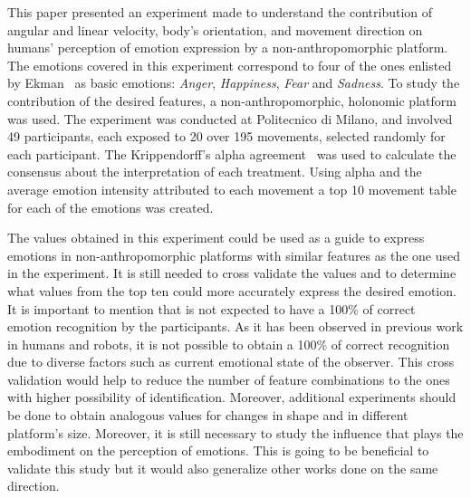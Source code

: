 This paper presented an experiment made to understand the contribution of angular and linear velocity, body's orientation, and movement direction on humans' perception of emotion expression by a non-anthropomorphic platform. The emotions covered in this experiment correspond to four of the ones enlisted by Ekman~\cite{Ekman2001} as basic emotions: \textit{Anger}, \textit{Happiness}, \textit{Fear} and \textit{Sadness}. To study the contribution of the desired features, a non-anthropomorphic, holonomic platform was used. The experiment was conducted at Politecnico di Milano, and involved 49 participants, each exposed to 20 over 195 movements, selected randomly for each participant. The Krippendorff's alpha agreement~\cite{Krippendorff2007} was used to calculate the consensus about the interpretation of each treatment. Using  alpha and the average emotion intensity attributed to each movement a top 10 movement table for each of the emotions was created.

The values obtained in this experiment could be used as a guide to express emotions in non-anthropomorphic platforms with similar features as the one used in the experiment. It is still needed to cross validate the values and to determine what values from the top ten could more accurately express the desired emotion. It is important to mention that is not expected to have a 100\% of correct emotion recognition by the participants. As it has been observed in previous work in humans and robots, it is not possible to obtain a 100\% of correct recognition due to diverse factors such as current emotional state of the observer. This cross validation would help to reduce the number of feature combinations to the ones with higher possibility of identification. Moreover, additional experiments should be done to obtain analogous values for changes in shape and in different platform's size. Moreover, it is still necessary to study the influence that plays the embodiment on the perception of emotions. This is going to be beneficial to validate this study but it would also generalize other works done on the same direction.

